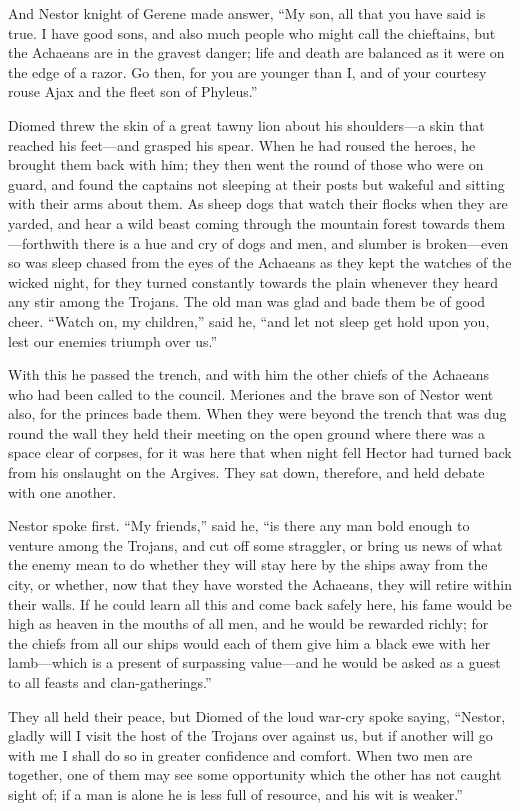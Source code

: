 And Nestor knight of Gerene made answer, “My son, all that you have said
is true. I have good sons, and also much people who might call the
chieftains, but the Achaeans are in the gravest danger; life and death are
balanced as it were on the edge of a razor. Go then, for you are younger
than I, and of your courtesy rouse Ajax and the fleet son of Phyleus.”

Diomed threw the skin of a great tawny lion about his shoulders—a
skin that reached his feet—and grasped his spear. When he had roused
the heroes, he brought them back with him; they then went the round of
those who were on guard, and found the captains not sleeping at their
posts but wakeful and sitting with their arms about them. As sheep dogs
that watch their flocks when they are yarded, and hear a wild beast coming
through the mountain forest towards them—forthwith there is a hue
and cry of dogs and men, and slumber is broken—even so was sleep
chased from the eyes of the Achaeans as they kept the watches of the
wicked night, for they turned constantly towards the plain whenever they
heard any stir among the Trojans. The old man was glad and bade them be of
good cheer. “Watch on, my children,” said he, “and let not sleep get hold
upon you, lest our enemies triumph over us.”

With this he passed the trench, and with him the other chiefs of the
Achaeans who had been called to the council. Meriones and the brave son of
Nestor went also, for the princes bade them. When they were beyond the
trench that was dug round the wall they held their meeting on the open
ground where there was a space clear of corpses, for it was here that when
night fell Hector had turned back from his onslaught on the Argives. They
sat down, therefore, and held debate with one another.

Nestor spoke first. “My friends,” said he, “is there any man bold enough
to venture among the Trojans, and cut off some straggler, or bring us news
of what the enemy mean to do whether they will stay here by the ships away
from the city, or whether, now that they have worsted the Achaeans, they
will retire within their walls. If he could learn all this and come back
safely here, his fame would be high as heaven in the mouths of all men,
and he would be rewarded richly; for the chiefs from all our ships would
each of them give him a black ewe with her lamb—which is a present
of surpassing value—and he would be asked as a guest to all feasts
and clan-gatherings.”

They all held their peace, but Diomed of the loud war-cry spoke saying,
“Nestor, gladly will I visit the host of the Trojans over against us, but
if another will go with me I shall do so in greater confidence and
comfort. When two men are together, one of them may see some opportunity
which the other has not caught sight of; if a man is alone he is less full
of resource, and his wit is weaker.”

